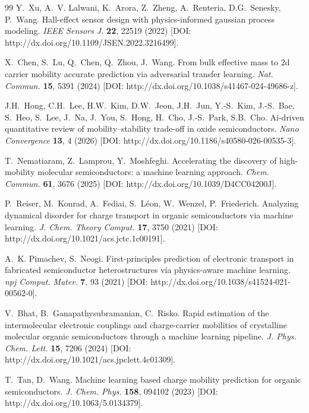 \documentclass[fleqn,twoside,twocolumn,nofootinbib,showkeys]{revtex4} %
\begin{document}
\begin{thebibliography}{99}
Y.~Xu, A.~V. Lalwani, K.~Arora, Z.~Zheng, A.~Renteria, D.G.~Senesky, P.~Wang. Hall-effect sensor design with physics-informed gaussian process modeling. \textit{IEEE Sensors J.} \textbf{22}, 22519 (2022) [DOI: http://dx.doi.org/10.1109/JSEN.2022.3216499].

X.~Chen, S.~Lu, Q.~Chen, Q.~Zhou, J.~Wang. From bulk effective mass to 2d carrier mobility accurate prediction via adversarial transfer learning. \textit{Nat. Commun.} \textbf{15}, 5391 (2024) [DOI: http://dx.doi.org/10.1038/s41467-024-49686-z].

J.H.~Hong, C.H.~Lee, H.W.~Kim, D.W.~Jeon, J.H.~Jun, Y.-S.~Kim, J.-S.~Bae, S.~Heo, S.~Lee, J.~Na, J.~You, S.~Hong, H.~Cho, J.-S.~Park, S.B.~Cho. Ai-driven quantitative review of mobility--stability trade-off in oxide semiconductors. \textit{Nano Convergence} \textbf{13}, 4 (2026) [DOI: http://dx.doi.org/10.1186/s40580-026-00535-3].

T.~Nematiaram, Z.~Lamprou, Y.~Moshfeghi. Accelerating the discovery of high-mobility molecular semiconductors: a machine learning approach. \textit{Chem. Commun.} \textbf{61}, 3676 (2025) [DOI: http://dx.doi.org/10.1039/D4CC04200J].

P.~Reiser, M.~Konrad, A.~Fediai, S.~L{\'e}on, W.~Wenzel, P.~Friederich. Analyzing dynamical disorder for charge transport in organic semiconductors via machine learning. \textit{J. Chem. Theory Comput.} \textbf{17}, 3750 (2021) [DOI: http://dx.doi.org/10.1021/acs.jctc.1c00191].

A.~K. Pimachev, S.~Neogi. First-principles prediction of electronic transport in fabricated semiconductor heterostructures via physics-aware machine learning. \textit{npj Comput. Mater.} \textbf{7}, 93 (2021) [DOI: http://dx.doi.org/10.1038/s41524-021-00562-0].

V.~Bhat, B.~Ganapathysubramanian, C.~Risko. Rapid estimation of the intermolecular electronic couplings and charge-carrier mobilities of crystalline molecular organic semiconductors through a machine learning pipeline. \textit{J. Phys. Chem. Lett.} \textbf{15}, 7206 (2024) [DOI: http://dx.doi.org/10.1021/acs.jpclett.4c01309].

T.~Tan, D.~Wang. Machine learning based charge mobility prediction for organic semiconductors. \textit{J. Chem. Phys.} \textbf{158}, 094102 (2023) [DOI: http://dx.doi.org/10.1063/5.0134379].


\end{thebibliography}
\end{document}
